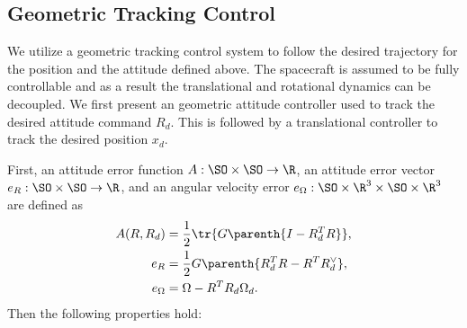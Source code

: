 \documentclass[smallextended]{svjour3}       %
\begin{document}
\subsection{Geometric Tracking Control}

We utilize a geometric tracking control system to follow the desired trajectory for the position and the attitude defined above. 
The spacecraft is assumed to be fully controllable and as a result the translational and rotational dynamics can be decoupled.
We first present an geometric attitude controller used to track the desired attitude command \( R_d \).
This is followed by a translational controller to track the desired position \( x_d \).

First, an attitude error function \(A : \SO \times \SO  \to \R \), an attitude error vector \( e_R : \SO \times \SO \to \R \), and an angular velocity error \( e_\Omega : \SO \times \R^3 \times \SO \times \R^3 \) are defined as
\begin{subequations}\label{eq:attitude_error_function}
\begin{align}
    A(R, R_d) &= \frac{1}{2}  \tr{G\parenth{I - R_d^T R}}, \label{eq:A} \\
    e_R &= \frac{1}{2} G \parenth{R_d^T R - R^T R_d^\vee}, \label{eq:eRA}\\
    e_\Omega &= \Omega - R^T R_d \Omega_d \label{eq:eWA}.
\end{align}
\end{subequations}
Then the following properties hold:
\end{document}
